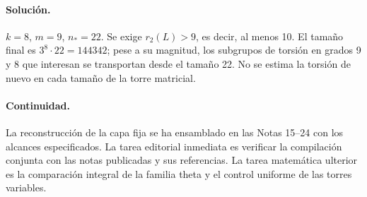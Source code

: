 \paragraph{Solución.} $k=8$, $m=9$, $n_*=22$. Se exige $r_2(L)>9$, es decir, al menos 10. El tamaño final es $3^8\cdot22=144342$; pese a su magnitud, los subgrupos de torsión en grados 9 y 8 que interesan se transportan desde el tamaño 22. No se estima la torsión de nuevo en cada tamaño de la torre matricial.

\paragraph{Continuidad.} La reconstrucción de la capa fija se ha ensamblado en las Notas 15--24 con los alcances especificados. La tarea editorial inmediata es verificar la compilación conjunta con las notas publicadas y sus referencias. La tarea matemática ulterior es la comparación integral de la familia theta y el control uniforme de las torres variables.